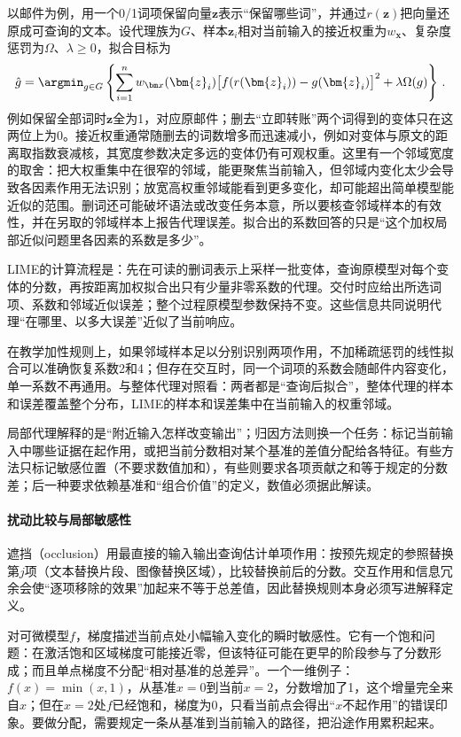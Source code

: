 以邮件为例，用一个0/1词项保留向量$\bm z$表示“保留哪些词”，并通过$r(\bm z)$把向量还原成可查询的文本。设代理族为$G$、样本$\bm z_i$相对当前输入的接近权重为$w_{\bm x}$、复杂度惩罚为$\Omega$、$\lambda\geq0$，拟合目标为
\begin{equation}
 \hat g=\argmin_{g\in G}\left\{
 \sum_{i=1}^{n}w_{\bm x}(\bm{z}_i)
 \bigl[f(r(\bm{z}_i))-g(\bm{z}_i)\bigr]^2
 +\lambda\Omega(g)\right\}\, .
 \label{eq:interpretability-lime}
\end{equation}
例如保留全部词时$\bm z$全为1，对应原邮件；删去“立即转账”两个词得到的变体只在这两位上为0。接近权重通常随删去的词数增多而迅速减小，例如对变体与原文的距离取指数衰减核，其宽度参数决定多远的变体仍有可观权重。这里有一个邻域宽度的取舍：把大权重集中在很窄的邻域，能更聚焦当前输入，但邻域内变化太少会导致各因素作用无法识别；放宽高权重邻域能看到更多变化，却可能超出简单模型能近似的范围。删词还可能破坏语法或改变任务本意，所以要核查邻域样本的有效性，并在另取的邻域样本上报告代理误差。拟合出的系数回答的只是“这个加权局部近似问题里各因素的系数是多少”。

LIME的计算流程是：先在可读的删词表示上采样一批变体，查询原模型对每个变体的分数，再按距离加权拟合出只有少量非零系数的代理。交付时应给出所选词项、系数和邻域近似误差；整个过程原模型参数保持不变。这些信息共同说明代理“在哪里、以多大误差”近似了当前响应。

在教学加性规则上，如果邻域样本足以分别识别两项作用，不加稀疏惩罚的线性拟合可以准确恢复系数2和4；但存在交互时，同一个词项的系数会随邮件内容变化，单一系数不再通用。与整体代理对照看：两者都是“查询后拟合”，整体代理的样本和误差覆盖整个分布，LIME的样本和误差集中在当前输入的权重邻域。

局部代理解释的是“附近输入怎样改变输出”；归因方法则换一个任务：标记当前输入中哪些证据在起作用，或把当前分数相对某个基准的差值分配给各特征。有些方法只标记敏感位置（不要求数值加和），有些则要求各项贡献之和等于规定的分数差；后一种要求依赖基准和“组合价值”的定义，数值必须据此解读。

\paragraph{扰动比较与局部敏感性}

遮挡（occlusion）用最直接的输入输出查询估计单项作用：按预先规定的参照替换第$j$项（文本替换片段、图像替换区域），比较替换前后的分数。交互作用和信息冗余会使“逐项移除的效果”加起来不等于总差值，因此替换规则本身必须写进解释定义。

对可微模型$f$，梯度描述当前点处小幅输入变化的瞬时敏感性。它有一个饱和问题：在激活饱和区域梯度可能接近零，但该特征可能在更早的阶段参与了分数形成；而且单点梯度不分配“相对基准的总差异”。一个一维例子：$f(x)=\min(x,1)$，从基准$x=0$到当前$x=2$，分数增加了1，这个增量完全来自$x$；但在$x=2$处$f$已经饱和，梯度为0，只看当前点会得出“$x$不起作用”的错误印象。要做分配，需要规定一条从基准到当前输入的路径，把沿途作用累积起来。

